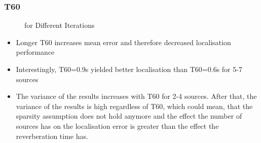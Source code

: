 \subsubsection{T60}
\begin{figure}[H]
	\begin{tikzpicture}
	    
	    
	\end{tikzpicture}
	\caption{\boxplotDescription for Different  Iterations}
	\label{fig:trial1}
\end{figure}

\begin{itemize}
    \item Longer T60 increases mean error and therefore decreased localisation performance
    \item Interestingly, T60=0.9s yielded better localisation than T60=0.6s for 5-7 sources
    \item The variance of the results increases with T60 for 2-4 sources. After that, the variance of the results is high regardless of T60, which could mean, that the sparsity assumption does not hold anymore and the effect the number of sources has on the localisation error is greater than the effect the reverberation time has.
\end{itemize}